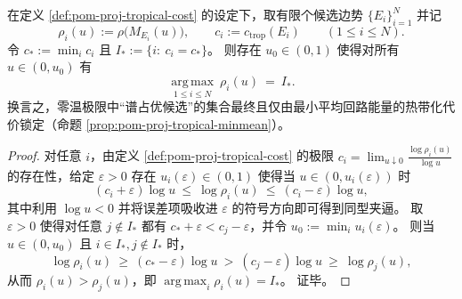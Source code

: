 \begin{corollary}\label{cor:pom-zero-temp-stable-selection}
在定义 \ref{def:pom-proj-tropical-cost} 的设定下，取有限个候选边势 \(\{E_i\}_{i=1}^N\) 并记
\[
\rho_i(u):=\rho\!\bigl(M_{E_i}(u)\bigr),\qquad
c_i:=c_{\mathrm{trop}}(E_i)\qquad(1\le i\le N).
\]
令 \(c_\ast:=\min_i c_i\) 且 \(I_\ast:=\{i:\ c_i=c_\ast\}\)。
则存在 \(u_0\in(0,1)\) 使得对所有 \(u\in(0,u_0)\) 有
\[
\operatorname*{arg\,max}_{1\le i\le N}\ \rho_i(u)\ =\ I_\ast.
\]
换言之，零温极限中“谱占优候选”的集合最终且仅由最小平均回路能量的热带化代价锁定（命题 \ref{prop:pom-proj-tropical-minmean}）。
\end{corollary}
\begin{proof}
对任意 \(i\)，由定义 \ref{def:pom-proj-tropical-cost} 的极限 \(c_i=\lim_{u\downarrow 0}\frac{\log\rho_i(u)}{\log u}\) 的存在性，给定 \(\varepsilon>0\) 存在 \(u_i(\varepsilon)\in(0,1)\) 使得当 \(u\in(0,u_i(\varepsilon))\) 时
\[
(c_i+\varepsilon)\log u\ \le\ \log\rho_i(u)\ \le\ (c_i-\varepsilon)\log u,
\]
其中利用 \(\log u<0\) 并将误差项吸收进 \(\varepsilon\) 的符号方向即可得到同型夹逼。
取 \(\varepsilon>0\) 使得对任意 \(j\notin I_\ast\) 都有 \(c_\ast+\varepsilon<c_j-\varepsilon\)，并令 \(u_0:=\min_i u_i(\varepsilon)\)。
则当 \(u\in(0,u_0)\) 且 \(i\in I_\ast,j\notin I_\ast\) 时，
\[
\log\rho_i(u)\ \ge\ (c_\ast-\varepsilon)\log u\ >\ (c_j-\varepsilon)\log u\ \ge\ \log\rho_j(u),
\]
从而 \(\rho_i(u)>\rho_j(u)\)，即 \(\operatorname*{arg\,max}_i \rho_i(u)=I_\ast\)。
证毕。
\end{proof}
